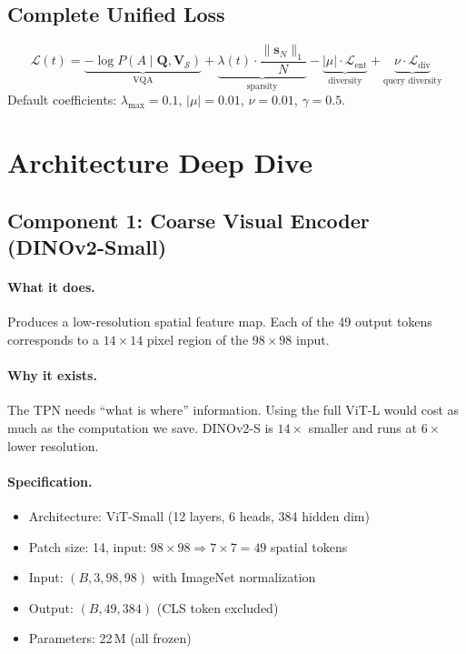 \documentclass[11pt,a4paper]{article}
\newcommand{\vs}{\mathbf{s}}
\newcommand{\mQ}{\mathbf{Q}}
\newcommand{\mV}{\mathbf{V}}
\begin{document}
\subsection{Complete Unified Loss}

\begin{definitionbox}[title={Full Training Loss}]
\begin{equation}
  \mathcal{L}(t) =
    \underbrace{-\log P(A \mid \mQ, \mV_{\mathcal{S}})}_{\text{VQA}}
    + \underbrace{\lambda(t) \cdot \frac{\|\vs_N\|_1}{N}}_{\text{sparsity}}
    - \underbrace{|\mu| \cdot \mathcal{L}_{\text{ent}}}_{\text{diversity}}
    + \underbrace{\nu \cdot \mathcal{L}_{\text{div}}}_{\text{query diversity}}
  \label{eq:total_loss}
\end{equation}
Default coefficients: $\lambda_{\max} = 0.1$, $|\mu| = 0.01$,
$\nu = 0.01$, $\gamma = 0.5$.
\end{definitionbox}

\section{Architecture Deep Dive}
\label{sec:architecture}

\subsection{Component 1: Coarse Visual Encoder (DINOv2-Small)}

\paragraph{What it does.}
Produces a low-resolution spatial feature map. Each of the 49 output tokens
corresponds to a $14 \times 14$ pixel region of the $98 \times 98$ input.

\paragraph{Why it exists.}
The TPN needs ``what is where'' information. Using the full ViT-L would
cost as much as the computation we save. DINOv2-S is $14\times$ smaller
and runs at $6\times$ lower resolution.

\paragraph{Specification.}
\begin{itemize}[leftmargin=1.5em, itemsep=1pt]
  \item Architecture: ViT-Small (12 layers, 6 heads, 384 hidden dim)
  \item Patch size: 14, input: $98 \times 98 \Rightarrow 7 \times 7 = 49$
    spatial tokens
  \item Input: $(B, 3, 98, 98)$ with ImageNet normalization
  \item Output: $(B, 49, 384)$ (CLS token excluded)
  \item Parameters: 22\,M (all frozen)
\end{itemize}
\end{document}
